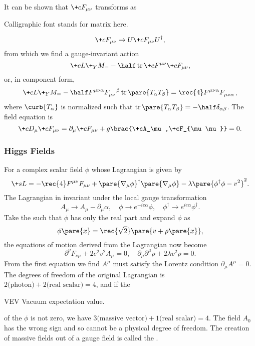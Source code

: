 \documentclass[hidelinks]{article}
\begin{document}
It can be shown that $\+cF_{\mu\nu}$ transforms as \begin{marginwarns}
    \raggedright
    Calligraphic font stands for matrix here.
\end{marginwarns}
\[ \+cF_{\mu\nu} \rightarrow U\+cF_{\mu\nu} U^\dagger, \]
from which we find a gauge-invariant action
\[ \+cL\+_YM_ = -\half \trace{\+cF^{\mu\nu}\+cF_{\mu\nu}}, \]
or, in component form,
\[ \+cL\+_YM_ = -\half \tensor{F}{^\mu^\nu^\alpha}\tensor{F}{_\mu_\nu^\beta}\trace\pare{T_\alpha T_\beta} = \rec{4}\tensor{F}{^\mu^\nu^\alpha}\tensor{F}{_\mu_\nu_\alpha}, \]
where $\curb{T_\alpha}$ is normalized such that $\displaystyle \trace\pare{T_\alpha T_\beta} = -\half \delta_{\alpha\beta}$. The field equation is
\[ \+cD_\mu \+cF_{\mu\nu} = \partial_\mu \+cF_{\mu\nu} + g\brac{\+cA_\mu,\+cF_{\mu\nu}} = 0. \]


\subsubsection{Higgs Fields} %
\label{ssub:higgs_fields}

For a complex scalar field $\phi$ whose Lagrangian is given by
\[ \+sL = -\rec{4}F^{\mu\nu}F_{\mu\nu} + \pare{\nabla_\mu \phi}^\dagger \pare{\nabla_\mu \phi} - \lambda\pare{\phi^\dagger\phi - v^2}^2. \]
The Lagrangian in invariant under the local gauge transformation
\[ A_\mu \rightarrow A_\mu - \partial_\mu \alpha,\quad \phi \rightarrow e^{-ie\alpha}\phi,\quad \phi^\dagger \rightarrow e^{ie\alpha}\phi^\dagger. \]
Take the  such that $\phi$ has only the real part and expand $\phi$ as
\[ \phi\pare{x} = \rec{\sqrt{2}}\pare{v+\rho\pare{x}}, \]
the equations of motion derived from the Lagrangian now become
\[ \partial^\nu F_{\nu\mu} + 2e^2v^2 A_\mu = 0,\quad \partial_\mu \partial^\mu \rho + 2\lambda v^2\rho = 0. \]
From the first equation we find $A^\mu$ must satisfy the Lorentz condition $\partial_\mu A^\mu = 0$. The degrees of freedom of the original Lagrangian is $2\text{(photon)}+2\text{(real scalar)} = 4$, and if the  \begin{margindef}[-4\baselineskip]{VEV}
    Vacuum expectation value.
\end{margindef}
 of the  $\phi$ is not zero, we have $3\text{(massive vector)}+1\text{(real scalar)}=4$. The field $A_0$ has the wrong sign and so cannot be a physical degree of freedom. The creation of massive fields out of a gauge field is called the .
\end{document}
